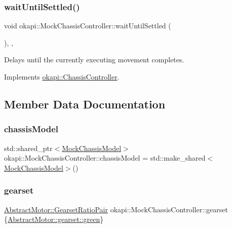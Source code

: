\subsubsection{\texorpdfstring{waitUntilSettled()}{waitUntilSettled()}}
{\footnotesize\ttfamily void okapi\+::\+Mock\+Chassis\+Controller\+::wait\+Until\+Settled (\begin{DoxyParamCaption}{ }\end{DoxyParamCaption})\hspace{0.3cm}{\ttfamily [inline]}, {\ttfamily [override]}, {\ttfamily [virtual]}}



Delays until the currently executing movement completes. 



Implements \mbox{\hyperlink{classokapi_1_1ChassisController_a01ed4e0eb7332cc149228387bbf1e91c}{okapi\+::\+Chassis\+Controller}}.



\subsection{Member Data Documentation}
\mbox{\label{classokapi_1_1MockChassisController_a698c575f9d7e064c6ecda7fb0c34ab97}} 
\subsubsection{\texorpdfstring{chassisModel}{chassisModel}}
{\footnotesize\ttfamily std\+::shared\+\_\+ptr$<$\mbox{\hyperlink{classokapi_1_1MockChassisModel}{Mock\+Chassis\+Model}}$>$ okapi\+::\+Mock\+Chassis\+Controller\+::chassis\+Model = std\+::make\+\_\+shared$<$\mbox{\hyperlink{classokapi_1_1MockChassisModel}{Mock\+Chassis\+Model}}$>$()}

\mbox{\label{classokapi_1_1MockChassisController_a2556c9d70808bb6b2566c7f68f07b5e7}} 
\subsubsection{\texorpdfstring{gearset}{gearset}}
{\footnotesize\ttfamily \mbox{\hyperlink{structokapi_1_1AbstractMotor_1_1GearsetRatioPair}{Abstract\+Motor\+::\+Gearset\+Ratio\+Pair}} okapi\+::\+Mock\+Chassis\+Controller\+::gearset \{\mbox{\hyperlink{classokapi_1_1AbstractMotor_a88aaa6ea2fa10f5520a537bbf26774d5a9f27410725ab8cc8854a2769c7a516b8}{Abstract\+Motor\+::gearset\+::green}}\}}

